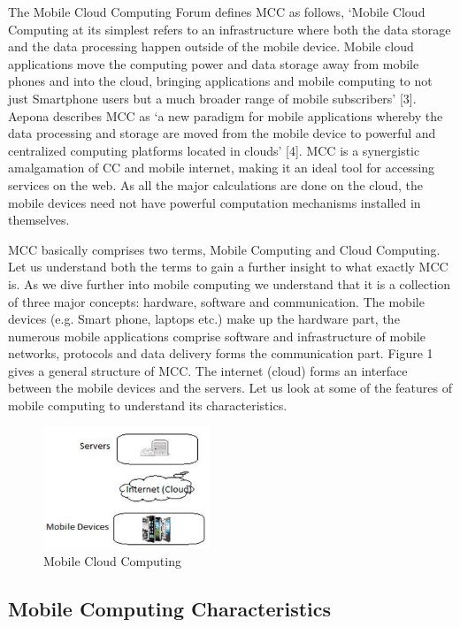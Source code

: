\documentclass[10pt, conference, compsocconf]{IEEEtran}
\begin{document}
The Mobile Cloud Computing Forum defines MCC as follows, `Mobile Cloud Computing at its simplest refers to an infrastructure where both the data storage and the data processing happen outside of the mobile device. Mobile cloud applications move the computing power and data storage away from mobile phones and into the cloud, bringing applications and mobile computing to not just Smartphone users but a much broader range of mobile subscribers' [3]. Aepona describes MCC as `a new paradigm for mobile applications whereby the data processing and storage are moved from the mobile device to powerful and centralized computing platforms located in clouds' [4]. MCC is a synergistic amalgamation of CC and mobile internet, making it an ideal tool for accessing services on the web. As all the major calculations are done on the cloud, the mobile devices need not have powerful computation mechanisms installed in themselves.



MCC basically comprises two terms, Mobile Computing and Cloud Computing. Let us understand both the terms to gain a further insight to what exactly MCC is. As we dive further into mobile computing we understand that it is a collection of three major concepts: hardware, software and communication. The mobile devices (e.g. Smart phone, laptops etc.) make up the hardware part, the numerous mobile applications comprise software and infrastructure of mobile networks, protocols and data delivery forms the communication part. Figure 1 gives a general structure of MCC. The internet (cloud) forms an interface between the mobile devices and the servers. Let us look at some of the features of mobile computing to understand its characteristics.

\begin{figure}[h!]
\begin{center}
    \includegraphics[scale=0.9, width=50mm]{fig1v2}
\end{center}
\caption{Mobile Cloud Computing}
\end{figure}



\subsection{Mobile Computing Characteristics}
\end{document}

